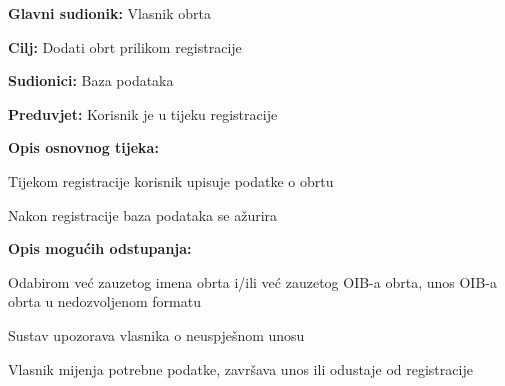 			    \noindent {}
					\begin{packed_item}
	
						\item \textbf{Glavni sudionik: } Vlasnik obrta
						\item  \textbf{Cilj:} Dodati obrt prilikom registracije
						\item  \textbf{Sudionici:} Baza podataka
						\item  \textbf{Preduvjet:} Korisnik je u tijeku registracije
						\item  \textbf{Opis osnovnog tijeka:}
						
						\item[] \begin{packed_enum}
	
							\item Tijekom registracije korisnik upisuje podatke o obrtu
							\item Nakon registracije baza podataka se ažurira
							
						\end{packed_enum}
						
						\item  \textbf{Opis mogućih odstupanja:}
						
						\item[] \begin{packed_item}
	
							\item[1.a] Odabirom već zauzetog imena obrta i/ili već zauzetog OIB-a obrta, unos OIB-a obrta u nedozvoljenom formatu
							\item[] \begin{packed_enum}
								
								\item Sustav upozorava vlasnika o neuspješnom unosu
								\item Vlasnik mijenja potrebne podatke, završava unos ili odustaje od registracije
								
							\end{packed_enum}
						\end{packed_item}
					\end{packed_item}

